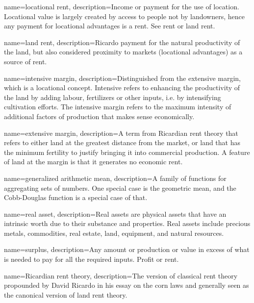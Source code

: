 {
name=locational rent,
description={Income or payment for the use of location. Locational value is largely created by access to people not by landowners, hence any payment for locational advantages is a rent. See \gls{rent} or \gls{land rent}.}
}

{
name=land rent,
description={Ricardo payment for  the natural productivity of the land, but also considered proximity to markets (locational advantages) as a source of rent. }
}

{
name=intensive margin,
description={Distinguished from the \gls{extensive margin}, which is a locational concept. Intensive refers to enhancing the productivity of the land by adding labour, fertilizers or other inputs, i.e. by intensifying cultivation efforts.  The intensive margin refers to the maximum intensity of additional factors of production that makes sense economically. }
}

{
name=extensive margin,
description={A term from Ricardian rent theory that refers to either land at the greatest distance from the market, or land that has the minimum fertility to justify bringing it into commercial production. A feature of land at the margin is that it generates no \gls{economic rent}.}
}

{
name=generalized arithmetic mean,
description={A family of functions for aggregating sets of numbers. One special case is the geometric mean,  and the Cobb-Douglas function is a special case of that.} %
}


{
name=real asset, 
description={Real assets are physical assets that have an intrinsic worth due to their substance and properties. Real assets include precious metals, commodities, real estate, land, equipment, and natural resources. }
}



{
name=surplus,
description={Any amount or production or value in excess of what is needed to pay for all the required inputs. Profit or rent. }
}

{
name=Ricardian rent theory,
description={The version of classical rent theory propounded by David Ricardo in his essay on the corn laws and generally seen as the  canonical version of land rent theory.}
}

